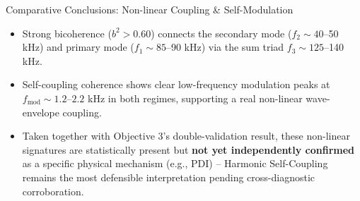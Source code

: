 \documentclass[aspectratio=169]{beamer}
\begin{document}
\begin{frame}{Comparative Conclusions: Non-linear Coupling \& Self-Modulation}
    \begin{itemize}
        \item Strong bicoherence ($b^2 > 0.60$) connects the secondary mode ($f_2 \sim 40$--50 kHz) and primary mode ($f_1 \sim 85$--90 kHz) via the sum triad $f_3 \sim 125$--140 kHz.
        \item Self-coupling coherence shows clear low-frequency modulation peaks at $f_{\text{mod}} \sim 1.2$--$2.2$ kHz in both regimes, supporting a real non-linear wave-envelope coupling.
        \item Taken together with Objective 3's double-validation result, these non-linear signatures are statistically present but \textbf{not yet independently confirmed} as a specific physical mechanism (e.g., PDI) -- Harmonic Self-Coupling remains the most defensible interpretation pending cross-diagnostic corroboration.
    \end{itemize}
\end{frame}
\end{document}
